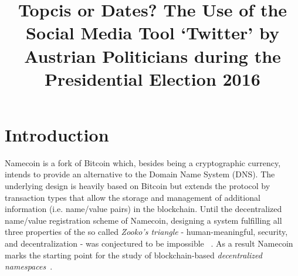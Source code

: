 \documentclass{llncs}
\begin{document}
	\frontmatter          %
	\mainmatter              %
	\title{Topcis or Dates? The Use of the Social Media Tool ‘Twitter’ by Austrian
		Politicians during the Presidential Election 2016}
	
	\maketitle              %
	
	\section{Introduction}
Namecoin is a fork of Bitcoin which, besides being a cryptographic currency, intends to provide an alternative to the Domain Name System (DNS).
The underlying design is heavily based on Bitcoin but extends the protocol by transaction types that allow the storage and management of additional information (i.e. name/value pairs) in the blockchain. 
Until the decentralized name/value registration scheme of Namecoin, designing a system fulfilling all three properties of the so called \textit{Zooko's triangle} - human-meaningful, security, and decentralization - was conjectured to be impossible ~\cite{online:schwarz2011zooko, kalodner2015namecoinempirical}. 
As a result Namecoin marks the starting point for the study of blockchain-based \textit{decentralized namespaces}~\cite{kalodner2015namecoinempirical}. 
\end{document}
